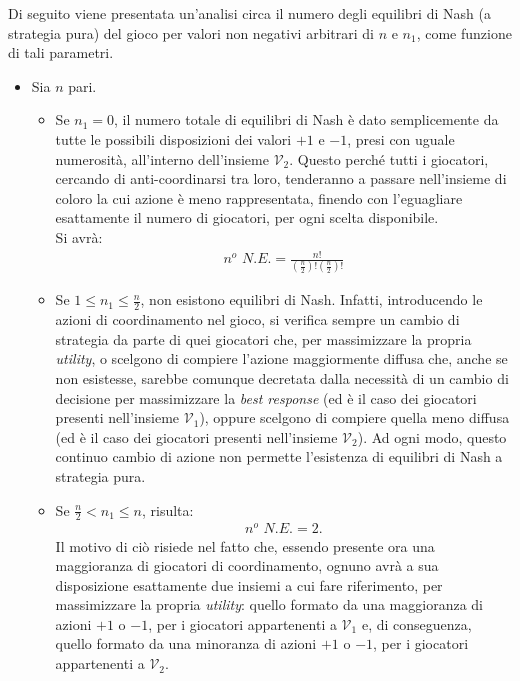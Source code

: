 \documentclass[11pt,largemargins]{homework}
\begin{document}
\begin{alphaparts}
\questionpart
Di seguito viene presentata un'analisi circa il numero degli equilibri di Nash (a strategia pura) del gioco per valori non negativi arbitrari di $n$ e $n_{1}$, come funzione di tali parametri.
   \begin{itemize}\item Sia $n$ pari.
   
   \begin{itemize}\item Se $n_{1}=0$, il numero totale di equilibri di Nash è dato semplicemente da tutte le possibili disposizioni dei valori $+1$ e $-1$, presi con uguale numerosità, all'interno dell'insieme $\mathcal{V}_2.$ Questo perché tutti i giocatori, cercando di anti-coordinarsi tra loro, tenderanno a passare nell'insieme di coloro la cui azione è meno rappresentata, finendo con l'eguagliare esattamente il numero di giocatori, per ogni scelta disponibile. 
   \\Si avrà:
   \begin{align*}
   n^{o} \, \,  N.E.=\frac{n!}{\left(\frac{n}{2}\right)!\left(\frac{n}{2}\right)!}
      \end{align*} 
      \item Se $1\leq n_{1}\leq \frac{n}{2}$, non esistono equilibri di Nash. Infatti, introducendo le azioni di coordinamento nel gioco, si verifica sempre un cambio di strategia da parte di quei giocatori che, per massimizzare la propria \emph{utility}, o scelgono di compiere l'azione maggiormente diffusa che, anche se non esistesse, sarebbe comunque decretata dalla necessità di un cambio di decisione per massimizzare la \emph{best response} (ed è il caso dei giocatori presenti nell'insieme $\mathcal{V}_1$), oppure scelgono di compiere quella meno diffusa (ed è il caso dei giocatori presenti nell'insieme $\mathcal{V}_2$). Ad ogni modo, questo continuo cambio di azione non permette l'esistenza di equilibri di Nash a strategia pura.
      \item Se $\frac{n}{2}< n_{1} \leq n$, risulta:
      \begin{align*}
      n^{o} \, \,  N.E.=2.
       \end{align*}
       Il motivo di ciò risiede nel fatto che, essendo presente ora una maggioranza di giocatori di coordinamento, ognuno avrà a sua disposizione esattamente due insiemi a cui fare riferimento, per massimizzare la propria \emph{utility}: quello formato da una maggioranza di azioni $+1$ o $-1$, per i giocatori appartenenti a $\mathcal{V}_1$ e, di conseguenza, quello formato da una minoranza di azioni $+1$ o $-1$, per i giocatori appartenenti a $\mathcal{V}_2.$

\end{itemize}
\end{itemize}
\end{alphaparts}
\end{document}
